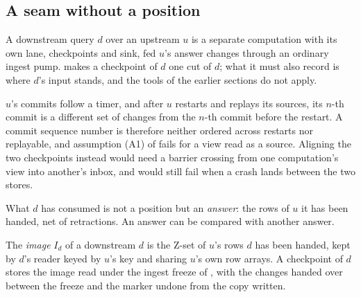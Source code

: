 \documentclass[11pt,a4paper]{article}
\renewcommand{\_}{\oldunderscore\allowbreak}
\newcommand{\defn}[1]{\emph{#1}}
\begin{document}
\subsection{A seam without a position}

A downstream query $d$ over an upstream $u$ is a separate computation with its own lane, checkpoints and
sink, fed $u$'s answer changes through an ordinary ingest pump.  makes a checkpoint of $d$
one cut of $d$; what it must also record is where $d$'s input stands, and the tools of the earlier
sections do not apply.

\begin{observation}\label{obs:noposition}
$u$'s commits follow a timer, and after $u$ restarts and replays its sources, its $n$-th commit is a
different set of changes from the $n$-th commit before the restart. A commit sequence number is therefore
neither ordered across restarts nor replayable, and assumption (A1) of  fails for a view
read as a source. Aligning the two checkpoints instead would need a barrier crossing from one
computation's view into another's inbox, and would still fail when a crash lands between the two stores.
\end{observation}

What $d$ has consumed is not a position but an \emph{answer}: the rows of $u$ it has been handed, net of
retractions. An answer can be compared with another answer.

\begin{definition}\label{def:image}
The \defn{image} $I_d$ of a downstream $d$ is the Z-set of $u$'s rows $d$ has been handed, kept by $d$'s
reader keyed by $u$'s key and sharing $u$'s own row arrays. A checkpoint of $d$ stores the image read
under the ingest freeze of , with the changes handed over between the freeze and the
marker undone from the copy written.
\end{definition}
\end{document}
